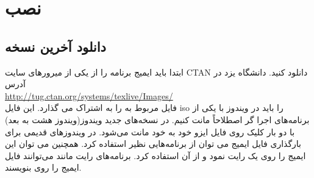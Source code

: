 \chapter{نصب }\label{chp:chap1}
\thispagestyle{empty}
\section{دانلود آخرین نسخه}\label{seq1-1}
ابتدا باید ایمیج برنامه را از یکی از میرور‌های سایت CTAN دانلود کنید. دانشگاه یزد در آدرس \\
\url{http://tug.ctan.org/systems/texlive/Images/ }\\
فایل  مربوط به  را به  اشتراک می گذارد. این فایل iso را باید در ویندوز با یکی از برنامه‌های اجرا گر اصطلاحاً مانت کنیم. در نسخه‌های جدید ویندوز(ویندوز هشت به بعد) با دو بار کلیک روی فایل ایزو خود به خود مانت می‌شود.  در ویندوز‌های قدیمی برای بارگذاری فایل ایمیج می توان از برنامه‌هایی نظیر  استفاده کرد. همچنین می توان این ایمیج را روی یک  رایت نمود و از آن استفاده کرد. برنامه‌های رایت مانند  می‌توانند فایل ایمیج را روی  بنویسند.

